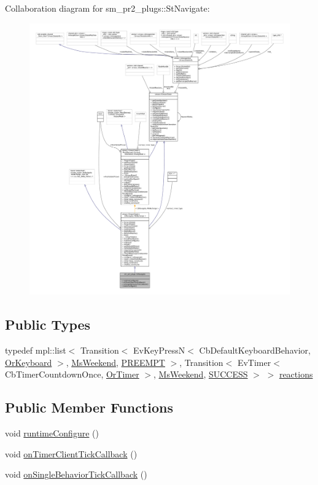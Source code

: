 Collaboration diagram for sm\+\_\+pr2\+\_\+plugs\+:\+:St\+Navigate\+:
\nopagebreak
\begin{figure}[H]
\begin{center}
\leavevmode
\includegraphics[width=350pt]{structsm__pr2__plugs_1_1StNavigate__coll__graph}
\end{center}
\end{figure}
\subsection*{Public Types}
\begin{DoxyCompactItemize}
\item 
typedef mpl\+::list$<$ Transition$<$ Ev\+Key\+PressN$<$ Cb\+Default\+Keyboard\+Behavior, \hyperlink{classsm__pr2__plugs_1_1OrKeyboard}{Or\+Keyboard} $>$, \hyperlink{classsm__pr2__plugs_1_1MsWeekend}{Ms\+Weekend}, \hyperlink{classPREEMPT}{P\+R\+E\+E\+M\+PT} $>$, Transition$<$ Ev\+Timer$<$ Cb\+Timer\+Countdown\+Once, \hyperlink{classsm__pr2__plugs_1_1OrTimer}{Or\+Timer} $>$, \hyperlink{classsm__pr2__plugs_1_1MsWeekend}{Ms\+Weekend}, \hyperlink{classSUCCESS}{S\+U\+C\+C\+E\+SS} $>$ $>$ \hyperlink{structsm__pr2__plugs_1_1StNavigate_add87afacee80fd59c74b8d4d74dc25ad}{reactions}
\end{DoxyCompactItemize}
\subsection*{Public Member Functions}
\begin{DoxyCompactItemize}
\item 
void \hyperlink{structsm__pr2__plugs_1_1StNavigate_ae7ab6b7fda6772eb50c512da21085cc0}{runtime\+Configure} ()
\item 
void \hyperlink{structsm__pr2__plugs_1_1StNavigate_a6340d786397971eff5772816cdf7affc}{on\+Timer\+Client\+Tick\+Callback} ()
\item 
void \hyperlink{structsm__pr2__plugs_1_1StNavigate_a0e58e927f01a817040c13987ecd4695f}{on\+Single\+Behavior\+Tick\+Callback} ()
\end{DoxyCompactItemize}
